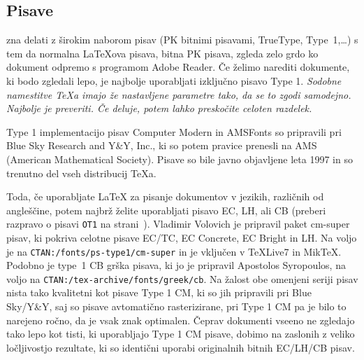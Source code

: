 \subsection{Pisave}

 zna delati z širokim naborom pisav 
(PK bitnimi pisavami, TrueType,
\PSi{} Type~1,\dots) s tem da normalna \LaTeX{}ova pisava,
bitna PK pisava, zgleda zelo grdo ko dokument odpremo s programom
Adobe Reader. Če želimo narediti dokumente, ki bodo zgledali lepo,
je najbolje uporabljati izključno pisavo \PSi{} Type 1. \emph{Sodobne
namestitve TeXa imajo že nastavljene parametre tako, da se 
to zgodi samodejno. Najbolje je preveriti. Če deluje, potem lahko preskočite
celoten razdelek.}


\PSi{} Type 1 implementacijo pisav Computer Modern in AMSFonts
so pripravili pri Blue Sky Research and Y\&Y, Inc., ki so potem pravice
prenesli na AMS (American Mathematical Society). Pisave so bile
javno objavljene leta 1997 in so trenutno del vseh distribucij \TeX{}a.

Toda, če uporabljate \LaTeX{} za pisanje dokumentov v jezikih,
različnih od angleščine, potem najbrž želite uporabljati pisavo EC, LH, ali CB (preberi razpravo o pisavi \texttt{OT1} na strani~\pageref{OT1}). 
Vladimir Volovich je pripravil paket cm-super pisav, ki pokriva
celotne pisave EC/TC, EC Concrete, EC Bright in LH. Na voljo je 
na \texttt{CTAN:/fonts/ps-type1/cm-super} in je vključen v 
\TeX{}Live7 in Mik\TeX. Podobno je type~1 CB grška pisava, ki jo je pripravil 
Apostolos Syropoulos, na voljo na \texttt{CTAN:/tex-archive/fonts/greek/cb}.
Na žalost obe omenjeni seriji pisav nista tako kvalitetni
kot pisave Type 1 CM, ki so jih pripravili pri Blue Sky/Y\&Y, saj so 
pisave avtomatično rasterizirane, pri Type 1 CM pa je bilo to narejeno ročno,
da je vsak znak optimalen. Čeprav dokumenti vseeno ne zgledajo tako lepo
kot tisti, ki uporabljajo Type 1 CM pisave, dobimo na zaslonih z veliko
ločljivostjo rezultate, ki so identični uporabi originalnih bitnih
EC/LH/CB pisav. 

